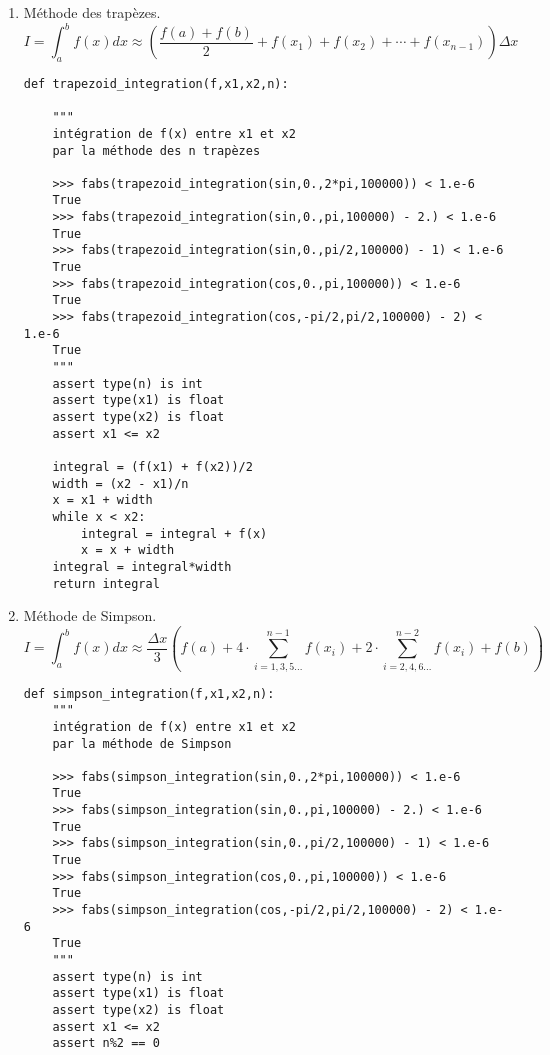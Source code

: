 \begin{description}
\begin{enumerate}
\begin{py}{20cm}
\begin{lstlisting}[title={\bf Intégration : méthode des rectangles}]
    integral = 0.0
    width = (x2 - x1)/n
    x = x1 + width/2
    while x < x2:
        integral = integral + f(x)
        x = x + width
    integral = integral*width
    return integral
	\end{lstlisting}
	\end{py}
	
	\newpage
	\item Méthode des trapèzes.
	$$\displaystyle I = \int_a^b f(x)dx \approx
		\left(\frac{f(a)+f(b)}{2} + f(x_1) + f(x_2) + \cdots + f(x_{n-1})\right)
		\Delta x$$	
	\begin{py}{14.5cm}
	\begin{lstlisting}[title={\bf Intégration : méthode des trapèzes}]
def trapezoid_integration(f,x1,x2,n):

    """
    intégration de f(x) entre x1 et x2
    par la méthode des n trapèzes

    >>> fabs(trapezoid_integration(sin,0.,2*pi,100000)) < 1.e-6
    True
    >>> fabs(trapezoid_integration(sin,0.,pi,100000) - 2.) < 1.e-6
    True
    >>> fabs(trapezoid_integration(sin,0.,pi/2,100000) - 1) < 1.e-6
    True
    >>> fabs(trapezoid_integration(cos,0.,pi,100000)) < 1.e-6
    True
    >>> fabs(trapezoid_integration(cos,-pi/2,pi/2,100000) - 2) < 1.e-6
    True
    """
    assert type(n) is int
    assert type(x1) is float
    assert type(x2) is float
    assert x1 <= x2

    integral = (f(x1) + f(x2))/2
    width = (x2 - x1)/n
    x = x1 + width
    while x < x2:
        integral = integral + f(x)
        x = x + width
    integral = integral*width
    return integral
	\end{lstlisting}
	\end{py}
	
	\newpage
	\item Méthode de Simpson.
	$$I = \int_a^b f(x)dx \approx \frac{\Delta x}{3}
		\left(f(a) + 4\cdot\sum_{i=1,3,5...}^{n-1}f(x_i) + 2\cdot\sum_{i=2,4,6...}^{n-2}f(x_i) + f(b)\right)$$	
	\begin{py}{14.5cm}
	\begin{lstlisting}[title={\bf Intégration : méthode de Simpson}]
def simpson_integration(f,x1,x2,n):
    """
    intégration de f(x) entre x1 et x2
    par la méthode de Simpson

    >>> fabs(simpson_integration(sin,0.,2*pi,100000)) < 1.e-6
    True
    >>> fabs(simpson_integration(sin,0.,pi,100000) - 2.) < 1.e-6
    True
    >>> fabs(simpson_integration(sin,0.,pi/2,100000) - 1) < 1.e-6
    True
    >>> fabs(simpson_integration(cos,0.,pi,100000)) < 1.e-6
    True
    >>> fabs(simpson_integration(cos,-pi/2,pi/2,100000) - 2) < 1.e-6
    True
    """
    assert type(n) is int
    assert type(x1) is float
    assert type(x2) is float
    assert x1 <= x2
    assert n%2 == 0


\end{lstlisting}
\end{py}
\end{enumerate}
\end{description}
